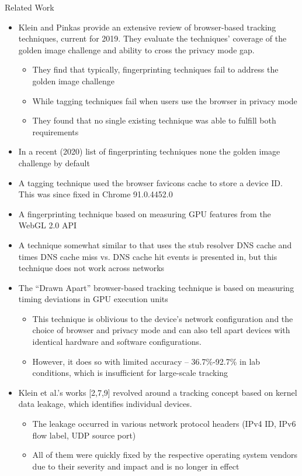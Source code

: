\documentclass[a4paper]{article}
\begin{document}
\begin{frame}[fragile]{Related Work}{}
	\begin{itemize}
		\item Klein and Pinkas provide an extensive review of browser-based tracking techniques, current for 2019. They evaluate the techniques’ coverage of the golden image challenge and ability to cross the privacy mode gap.
		\begin{itemize}
			\item They find that typically, fingerprinting techniques fail to address the golden image challenge
			\item While tagging techniques fail when users use the browser in privacy mode
			\item They found that no single existing technique was able to fulfill both requirements
		\end{itemize}
		\item In a recent (2020) list of fingerprinting techniques none the golden image challenge by default
		\item A tagging technique used the browser favicons cache to store a device ID. This was since fixed in Chrome 91.0.4452.0
		\item A fingerprinting technique based on measuring GPU features from the WebGL 2.0 API
		\item A technique somewhat similar to that uses the stub resolver DNS cache and times DNS cache miss vs. DNS cache hit events is presented in, but this technique does not work across networks
		\item The \enquote{Drawn Apart} browser-based tracking technique is based on measuring timing deviations in GPU execution units
		\begin{itemize}
			\item This technique is oblivious to the device’s network configuration and the choice of browser and privacy mode and can also tell apart devices with identical hardware and software configurations.
			\item However, it does so with limited accuracy – 36.7\%-92.7\% in lab conditions, which is insufficient for large-scale tracking
		\end{itemize}
		\item Klein et al.’s works [2,7,9] revolved around a tracking concept based on kernel data leakage, which identifies individual devices.
		\begin{itemize}
			\item The leakage occurred in various network protocol headers (IPv4 ID, IPv6 flow label, UDP source port)
			\item All of them were quickly fixed by the respective operating system vendors due to their severity and impact and is no longer in effect
		\end{itemize}
	\end{itemize}
\end{frame}
\end{document}
